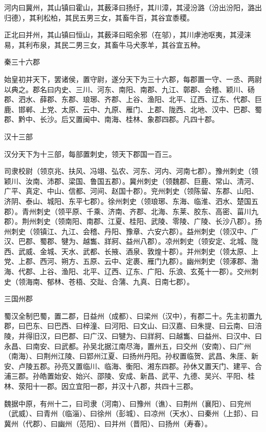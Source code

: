 \documentclass[a4paper,12pt,UTF8,twoside]{ctexbook}
\begin{document}
	河内曰冀州，其山镇曰霍山，其薮泽曰扬纡，其川漳，其浸汾潞（汾出汾阳，潞出归德），其利松柏，其民五男三女，其畜牛百，其谷宜黍稷。
	
	正北曰并州，其山镇曰恒山，其薮泽曰昭余邪（在邬），其川虖池呕夷，其浸涞易，其利布泉，其民二男三女，其畜牛马犬豕羊，其谷宜五种。
	
	秦三十六郡
	
	始皇初并天下，罢诸侯，置守尉，遂分天下为三十六郡，每郡置一守、一丞、两尉以典之。郡名曰内史、三川、河东、南阳、南郡、九江、鄣郡、会稽、颖川、砀郡、泗水、薛郡、东郡、琅琊、齐郡、上谷、渔阳、北平、辽西、辽东、代郡、巨鹿、邯郸、上党、太原、云中、九原、雁门、上郡、陇西、北地、汉中、巴郡、蜀郡、黔中、长沙。后又置闽中、南海、桂林、象郡四郡。凡四十郡。
	
	汉十三部
	
	汉分天下为十三部，每部置刺史，领天下郡国一百三。
	
	司隶校尉（领京兆、扶风、冯翊、弘农、河东、河内、河南七郡）。豫州刺史（领颖川、汝南、沛郡、梁国、鲁国五郡）。冀州刺史（领魏郡、巨鹿、常山、清河、广平、真定、中山、信都、河间、赵国十郡）。兖州刺史（领陈留、东郡、山阳、济阴、泰山、城阳、东平七郡）。徐州刺史（领琅琊、东海、临淮、泗水、楚国五郡）。青州刺史（领平原、千乘、济南、齐郡、北海、东莱、胶东、高密、菑川九郡）。荆州刺史（领南阳、南郡、江夏、桂阳、武陵、零陵、广陵、长沙八郡）。扬州刺史（领镇江、九江、会稽、丹阳、豫章、六安六郡）。益州刺史（领汉中、广汉、巴郡、蜀郡、犍为、越雟、牂牁、益州八郡）。凉州刺史（领安定、北城、陇西、武威、金城、天水、武都、长掖、酒泉、敦煌十郡）。并州刺史（领太原、上党、上郡、西河、朔方、五原、云中、定裹、雁门九郡）。幽州刺史（领涿郡、渤海、代郡、上谷、渔阳、北平、辽西、辽东、广阳、乐浪、玄菟十一郡）。交州刺史（领海南、郁林、苍梧、交趾、合蒲、九真、日南七郡）。
	
	三国州郡
	
	蜀汉全制巴蜀，置二郡，日益州（成都）、曰梁州（汉中），有郡二十。先主初置九郡，曰巴东、曰巴西、曰梓潼、曰河阳、曰文山、曰汉嘉、曰朱提、曰云南、曰涪陵，并得旧汉，曰巴郡、曰广汉、曰犍为、曰牂牁、曰越雟、曰益州、曰汉中、曰永昌、曰南安、曰武都。孙吴北据江南尽海，置州五，曰交州（安南）、曰广州（南海）、曰荆州江陵、曰郢州江夏、曰扬州丹阳。孙权置临贺、武昌、朱厓、新安、卢陵五郡。孙亮又置临川、临海、衡阳、湘东四郡。孙休又置天门、建平、合浦三郡。孙皓置始安、始兴、邵陵、安成、新昌、武平、九德、吴兴、平阳、桂林、荥阳十一郡。因立宜阳一郡，并汉十八郡，共四十三郡。
	
	魏据中原，有州十二，曰司隶（河南）、曰豫州（谯）、曰荆州（襄阳）、曰兖州（武威）、曰青州（临淄）、曰徐州（彭城）、曰凉州（天水）、曰秦州（上邽）、曰冀州（代郡）、曰幽州（范阳）、曰并州（晋阳）、曰扬州（寿春）。
	
\end{document}

